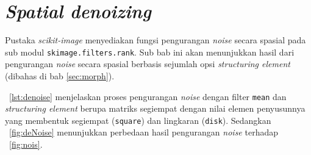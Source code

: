 \section{\textit{Spatial denoizing}}
Pustaka \textit{scikit-image} menyediakan fungsi pengurangan \textit{noise} secara spasial pada sub modul \texttt{skimage.filters.rank}. Sub bab ini akan menunjukkan hasil dari pengurangan \textit{noise} secara spasial berbasis sejumlah opsi \textit{structuring element} (dibahas di bab \ref{sec:morph}). 

\lstlistingname~\ref{lst:denoise} menjelaskan proses pengurangan \textit{noise} dengan filter \texttt{mean} dan \textit{structuring element} berupa matriks segiempat dengan nilai elemen penyusunnya yang membentuk segiempat (\texttt{square}) dan lingkaran (\texttt{disk}). Sedangkan \figurename~\ref{fig:deNoise} menunjukkan perbedaan hasil pengurangan \textit{noise} terhadap \figurename~\ref{fig:nois}.

\scriptsize

\normalsize

